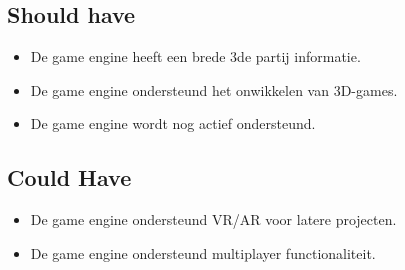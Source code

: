 \subsection{Should have}
\begin{itemize}
    \item De game engine heeft een brede 3de partij informatie.
    \item De game engine ondersteund het onwikkelen van 3D-games.
    \item De game engine wordt nog actief ondersteund.
\end{itemize}

\subsection{Could Have}
\begin{itemize}
    \item De game engine ondersteund VR/AR voor latere projecten.
    \item De game engine ondersteund multiplayer functionaliteit.
\end{itemize}